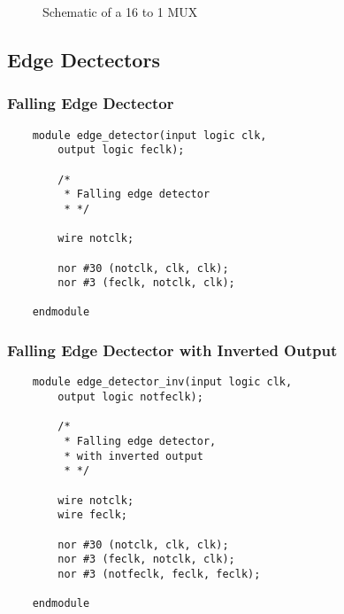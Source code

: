 \documentclass[../main]{subfiles}
\begin{document}
\begin{figure} [!ht]
{
    }
    \caption{Schematic of a 16 to 1 MUX}
\end{figure}

\subsection {Edge Dectectors}

\subsubsection {Falling Edge Dectector}

\begin{verbatim}
    module edge_detector(input logic clk,
        output logic feclk);

        /*
         * Falling edge detector
         * */

        wire notclk;

        nor #30 (notclk, clk, clk);
        nor #3 (feclk, notclk, clk);

    endmodule
\end{verbatim}

\subsubsection {Falling Edge Dectector with Inverted Output}

\begin{verbatim}
    module edge_detector_inv(input logic clk,
        output logic notfeclk);

        /*
         * Falling edge detector,
         * with inverted output
         * */

        wire notclk;
        wire feclk;

        nor #30 (notclk, clk, clk);
        nor #3 (feclk, notclk, clk);
        nor #3 (notfeclk, feclk, feclk);

    endmodule
\end{verbatim}
\end{document}
